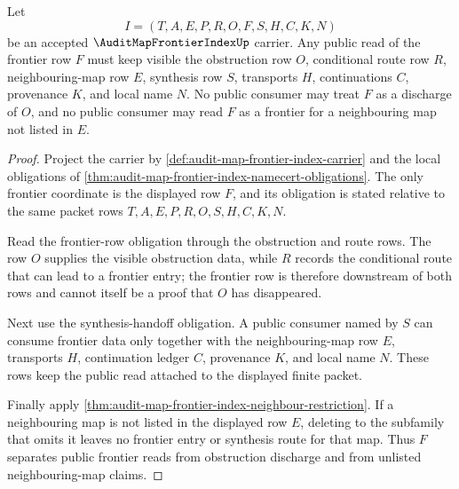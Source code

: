 \begin{theorem}
\label{thm:audit-map-frontier-index-public-obstruction-frontier-separation}
Let
$$
I=(T,A,E,P,R,O,F,S,H,C,K,N)
$$
be an accepted $\AuditMapFrontierIndexUp$ carrier. Any public read of the frontier row $F$ must keep visible the obstruction row $O$, conditional route row $R$, neighbouring-map row $E$, synthesis row $S$, transports $H$, continuations $C$, provenance $K$, and local name $N$. No public consumer may treat $F$ as a discharge of $O$, and no public consumer may read $F$ as a frontier for a neighbouring map not listed in $E$.
\end{theorem}
\begin{proof}
Project the carrier by \autoref{def:audit-map-frontier-index-carrier} and the local obligations of \autoref{thm:audit-map-frontier-index-namecert-obligations}. The only frontier coordinate is the displayed row $F$, and its obligation is stated relative to the same packet rows $T,A,E,P,R,O,S,H,C,K,N$.

Read the frontier-row obligation through the obstruction and route rows. The row $O$ supplies the visible obstruction data, while $R$ records the conditional route that can lead to a frontier entry; the frontier row is therefore downstream of both rows and cannot itself be a proof that $O$ has disappeared.

Next use the synthesis-handoff obligation. A public consumer named by $S$ can consume frontier data only together with the neighbouring-map row $E$, transports $H$, continuation ledger $C$, provenance $K$, and local name $N$. These rows keep the public read attached to the displayed finite packet.

Finally apply \autoref{thm:audit-map-frontier-index-neighbour-restriction}. If a neighbouring map is not listed in the displayed row $E$, deleting to the subfamily that omits it leaves no frontier entry or synthesis route for that map. Thus $F$ separates public frontier reads from obstruction discharge and from unlisted neighbouring-map claims.
\end{proof}

